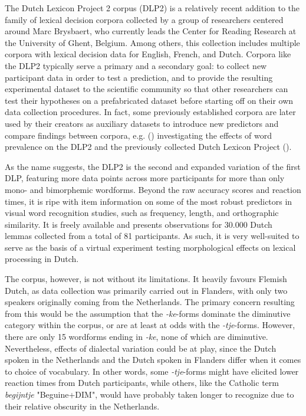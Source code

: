 The Dutch Lexicon Project 2 corpus (DLP2) is a relatively recent addition to the family of lexical decision corpora collected by a group of researchers centered around Marc Brysbaert, who currently leads the Center for Reading Research at the University of Ghent, Belgium. Among others, this collection includes multiple corpora with lexical decision data for English, French, and Dutch. Corpora like the DLP2 typically serve a primary and a secondary goal: to collect new participant data in order to test a prediction, and to provide the resulting experimental dataset to the scientific community so that other researchers can test their hypotheses on a prefabricated dataset before starting off on their own data collection procedures. In fact, some previously established corpora are later used by their creators as auxiliary datasets to introduce new predictors and compare findings between corpora, e.g. \citeauthor{Brysbaert+etal+2016} (\citeyear{Brysbaert+etal+2016}) investigating the effects of word prevalence on the DLP2 and the previously collected Dutch Lexicon Project (\cite{Keuleers+etal+2010b}). 

As the name suggests, the DLP2 is the second and expanded variation of the first DLP, featuring more data points across more participants for more than only mono- and bimorphemic wordforms. Beyond the raw accuracy scores and reaction times, it is ripe with item information on some of the most robust predictors in visual word recognition studies, such as frequency, length, and orthographic similarity. It is freely available and presents observations for 30.000 Dutch lemmas collected from a total of 81 participants. As such, it is very well-suited to serve as the basis of a virtual experiment testing morphological effects on lexical processing in Dutch.

The corpus, however, is not without its limitations. It heavily favours Flemish Dutch, as data collection was primarily carried out in Flanders, with only two speakers originally coming from the Netherlands. The primary concern resulting from this would be the assumption that the \textit{-ke}-forms dominate the diminutive category within the corpus, or are at least at odds with the \textit{-tje}-forms. However, there are only 15 wordforms ending in \textit{-ke}, none of which are diminutive. Nevertheless, effects of dialectal variation could be at play, since the Dutch spoken in the Netherlands and the Dutch spoken in Flanders differ when it comes to choice of vocabulary. In other words, some \textit{-tje}-forms might have elicited lower reaction times from Dutch participants, while others, like the Catholic term \textit{begijntje} "Beguine+DIM", would have probably taken longer to recognize due to their relative obscurity in the Netherlands.

